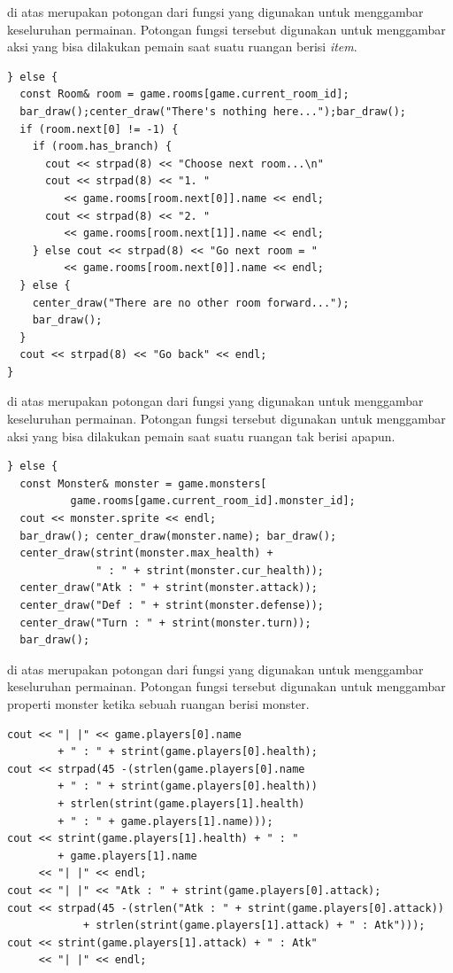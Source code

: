 \documentclass[../main.tex]{subfiles}
\begin{document}
{\Script} di atas merupakan potongan dari fungsi  yang digunakan untuk menggambar keseluruhan permainan. Potongan fungsi tersebut digunakan untuk menggambar aksi yang bisa dilakukan pemain saat suatu ruangan berisi \textit{item}.

\begin{code}
\begin{verbatim}
} else {
  const Room& room = game.rooms[game.current_room_id];
  bar_draw();center_draw("There's nothing here...");bar_draw();
  if (room.next[0] != -1) {
    if (room.has_branch) {
      cout << strpad(8) << "Choose next room...\n"
      cout << strpad(8) << "1. "
         << game.rooms[room.next[0]].name << endl;
      cout << strpad(8) << "2. "
         << game.rooms[room.next[1]].name << endl;
    } else cout << strpad(8) << "Go next room = "
         << game.rooms[room.next[0]].name << endl;
  } else {
    center_draw("There are no other room forward...");
    bar_draw();
  }
  cout << strpad(8) << "Go back" << endl;
}
\end{verbatim}
\end{code}

{\Script} di atas merupakan potongan dari fungsi  yang digunakan untuk menggambar keseluruhan permainan. Potongan fungsi tersebut digunakan untuk menggambar aksi yang bisa dilakukan pemain saat suatu ruangan tak berisi apapun.

\begin{code}
\begin{verbatim}
} else {
  const Monster& monster = game.monsters[
          game.rooms[game.current_room_id].monster_id];
  cout << monster.sprite << endl;
  bar_draw(); center_draw(monster.name); bar_draw();
  center_draw(strint(monster.max_health) +
              " : " + strint(monster.cur_health));
  center_draw("Atk : " + strint(monster.attack));
  center_draw("Def : " + strint(monster.defense));
  center_draw("Turn : " + strint(monster.turn));
  bar_draw();
\end{verbatim}
\end{code}

{\Script} di atas merupakan potongan dari fungsi  yang digunakan untuk menggambar keseluruhan permainan. Potongan fungsi tersebut digunakan untuk menggambar properti monster ketika sebuah ruangan berisi monster.

\begin{code}
\begin{verbatim}
cout << "| |" << game.players[0].name
        + " : " + strint(game.players[0].health);
cout << strpad(45 -(strlen(game.players[0].name
        + " : " + strint(game.players[0].health))
        + strlen(strint(game.players[1].health)
        + " : " + game.players[1].name)));
cout << strint(game.players[1].health) + " : "
        + game.players[1].name
     << "| |" << endl;
cout << "| |" << "Atk : " + strint(game.players[0].attack);
cout << strpad(45 -(strlen("Atk : " + strint(game.players[0].attack))
            + strlen(strint(game.players[1].attack) + " : Atk")));
cout << strint(game.players[1].attack) + " : Atk"
     << "| |" << endl;
\end{verbatim}
\end{code}
\end{document}
